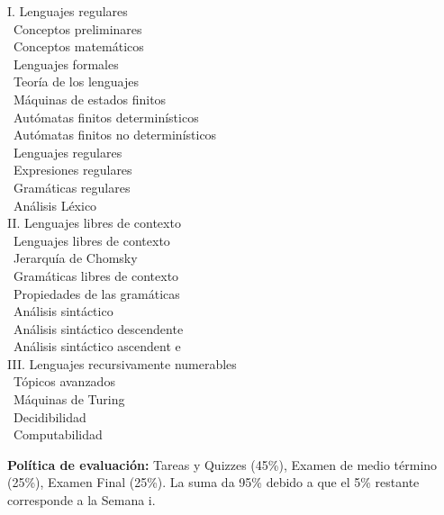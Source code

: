 \documentclass[12pt, letterpaper, oneside]{article}
\newcommand{\topic}{{\color{darkgreen}{\Rectangle}}}
\newcommand{\subtopic}{{\enskip \color{darkblue}{\Rectangle}}}
\begin{document}
  \begin{center} 
  \begin{minipage}{5in}
  \begin{flushleft}
  {\large I. Lenguajes regulares} \\[2ex]
  \topic ~Conceptos preliminares \\
  \subtopic ~Conceptos matemáticos \\
  \subtopic ~Lenguajes formales \\
  \topic ~Teoría de los lenguajes \\
  \subtopic ~Máquinas de estados finitos \\
  \subtopic ~Autómatas finitos determinísticos \\
  \subtopic ~Autómatas finitos no determinísticos \\
  \topic ~Lenguajes regulares \\
  \subtopic ~Expresiones regulares \\
  \subtopic ~Gramáticas regulares \\
  \subtopic ~Análisis Léxico \\[2.5ex]
  {\large II. Lenguajes libres de contexto }\\[2ex]
  \topic ~Lenguajes libres de contexto \\
  \subtopic ~Jerarquía de Chomsky \\
  \subtopic ~Gramáticas libres de contexto \\
  \subtopic ~Propiedades de las gramáticas \\
  \topic ~Análisis sintáctico \\
  \subtopic ~Análisis sintáctico descendente \\
  \subtopic ~Análisis sintáctico ascendent e\\[2.5ex]
  {\large III. Lenguajes recursivamente numerables} \\[2ex]
  \topic ~Tópicos avanzados \\
  \subtopic ~Máquinas de Turing \\
  \subtopic ~Decidibilidad \\
  \subtopic ~Computabilidad
  \end{flushleft}
  \end{minipage}
  \end{center}

  \vspace*{.15in}
  \noindent\textbf{Política de evaluación:}
  Tareas y Quizzes (45\%), Examen de medio término (25\%), Examen Final (25\%).
  La suma da 95\% debido a que el 5\% restante corresponde a la Semana i.
\end{document}
